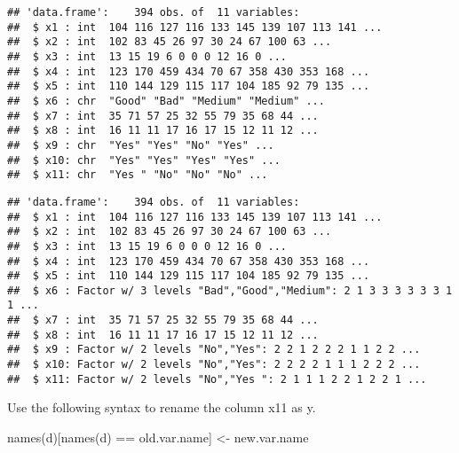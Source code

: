 \documentclass[
]{article}
\newenvironment{Shaded}{\begin{snugshade}}{\end{snugshade}}
\newcommand{\FunctionTok}[1]{\textcolor[rgb]{0.00,0.00,0.00}{#1}}
\newcommand{\NormalTok}[1]{#1}
\newcommand{\OtherTok}[1]{\textcolor[rgb]{0.56,0.35,0.01}{#1}}
\newcommand{\SpecialCharTok}[1]{\textcolor[rgb]{0.00,0.00,0.00}{#1}}
\newcommand{\StringTok}[1]{\textcolor[rgb]{0.31,0.60,0.02}{#1}}
\begin{document}
\begin{verbatim}
## 'data.frame':    394 obs. of  11 variables:
##  $ x1 : int  104 116 127 116 133 145 139 107 113 141 ...
##  $ x2 : int  102 83 45 26 97 30 24 67 100 63 ...
##  $ x3 : int  13 15 19 6 0 0 0 12 16 0 ...
##  $ x4 : int  123 170 459 434 70 67 358 430 353 168 ...
##  $ x5 : int  110 144 129 115 117 104 185 92 79 135 ...
##  $ x6 : chr  "Good" "Bad" "Medium" "Medium" ...
##  $ x7 : int  35 71 57 25 32 55 79 35 68 44 ...
##  $ x8 : int  16 11 11 17 16 17 15 12 11 12 ...
##  $ x9 : chr  "Yes" "Yes" "No" "Yes" ...
##  $ x10: chr  "Yes" "Yes" "Yes" "Yes" ...
##  $ x11: chr  "Yes " "No" "No" "No" ...
\end{verbatim}

\begin{Shaded}
\end{Shaded}

\begin{verbatim}
## 'data.frame':    394 obs. of  11 variables:
##  $ x1 : int  104 116 127 116 133 145 139 107 113 141 ...
##  $ x2 : int  102 83 45 26 97 30 24 67 100 63 ...
##  $ x3 : int  13 15 19 6 0 0 0 12 16 0 ...
##  $ x4 : int  123 170 459 434 70 67 358 430 353 168 ...
##  $ x5 : int  110 144 129 115 117 104 185 92 79 135 ...
##  $ x6 : Factor w/ 3 levels "Bad","Good","Medium": 2 1 3 3 3 3 3 3 1 1 ...
##  $ x7 : int  35 71 57 25 32 55 79 35 68 44 ...
##  $ x8 : int  16 11 11 17 16 17 15 12 11 12 ...
##  $ x9 : Factor w/ 2 levels "No","Yes": 2 2 1 2 2 2 1 1 2 2 ...
##  $ x10: Factor w/ 2 levels "No","Yes": 2 2 2 2 1 1 1 2 2 2 ...
##  $ x11: Factor w/ 2 levels "No","Yes ": 2 1 1 1 2 2 1 2 2 1 ...
\end{verbatim}

Use the following syntax to rename the column x11 as y.

\begin{Shaded}
\begin{Highlighting}[]
\FunctionTok{names}\NormalTok{(d)[}\FunctionTok{names}\NormalTok{(d) }\SpecialCharTok{==} \StringTok{\textquotesingle{}old.var.name\textquotesingle{}}\NormalTok{] }\OtherTok{\textless{}{-}} \StringTok{\textquotesingle{}new.var.name\textquotesingle{}}
\end{Highlighting}
\end{Shaded}
\end{document}
